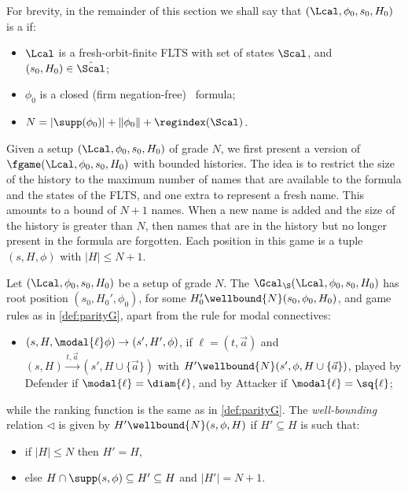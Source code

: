 For brevity, in the remainder of this section we shall say that $(\Lcal,\phi_0,s_0,H_0)$ is a  if:
\begin{itemize}
\item $\Lcal$ is a fresh-orbit-finite FLTS with set of states $\Scal$, and $(s_0,H_0)\in\hat \Scal$;
\item $\phi_0$ is a closed (firm negation-free) \fhml\ formula;
\item $N = |\supp(\phi_0)| + \|\phi_0\| + \regindex(\Scal)$. 
\end{itemize}
Given a setup $(\Lcal,\phi_0,s_0,H_0)$ of grade $N$, we first present a version of $\fgame(\Lcal,\phi_0,s_0,H_0)$ with bounded histories. 
The idea is to restrict the size of the history to the maximum number of names that are available to the formula and the states of the FLTS, and one extra to represent a fresh name. This amounts to a bound of $N+1$ names. 
When a new name is added and the size of the history is greater than $N$, then names that are in the history but no longer present in the formula are forgotten. 
Each position in this game is a tuple $(s, H, \phi)$ with $|H|\leq N+1$.
\begin{definition}
Let $(\Lcal,\phi_0,s_0,H_0)$ be a setup of grade $N$. 
The  $\Gcal_\S(\Lcal,\phi_0, s_0, H_0)$ has root
 position $(s_0, H_0', \phi_0)$, for some $H_0'\wellbound{N}(s_0,\phi_0,H_0)$, and game rules as in \cref{def:parityG}, apart from the rule for modal connectives:
    \begin{itemize}
            \item $(s,H, \modal{\ell}\phi) \rightarrow (s',H', \phi)$, if $\ell=(t, \vec a)$
        and $(s,H) \xrightarrow{t, \vec a} (s',H\cup\{\vec a\})$ with $H'\wellbound{N}(s',\phi,H\cup\{\vec a\})$,
        played by Defender if $\modal{\ell}=\diam{\ell}$, and by Attacker if $\modal{\ell}=\sq{\ell}$;
        \end{itemize}
while the ranking function is the same as in \cref{def:parityG}.
The \emph{well-bounding} relation $\triangleleft$ is given by $H'\wellbound{N}(s,\phi,H)$ if $H'\subseteq H$ is such that:
\begin{itemize}
            \item if $|H| \le N$ then $H' = H$,
            \item else $H \cap \supp(s,\phi) \subseteq H' \subseteq H$ and $|H'| = N + 1$.
        \end{itemize}
\end{definition}

